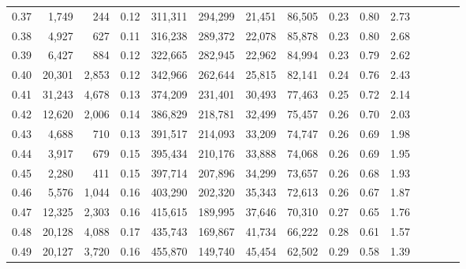 \begin{tabular}{rrrcrrrrrrrrrrr}
0.37 &   1,749 &    244 &                                       0.12 &  311,311 &  294,299 &   21,451 &   86,505 &  0.23 &  0.80 &                         2.73 \\
0.38 &   4,927 &    627 &                                       0.11 &  316,238 &  289,372 &   22,078 &   85,878 &  0.23 &  0.80 &                         2.68 \\
0.39 &   6,427 &    884 &                                       0.12 &  322,665 &  282,945 &   22,962 &   84,994 &  0.23 &  0.79 &                         2.62 \\
0.40 &  20,301 &  2,853 &                                       0.12 &  342,966 &  262,644 &   25,815 &   82,141 &  0.24 &  0.76 &                         2.43 \\
0.41 &  31,243 &  4,678 &                                       0.13 &  374,209 &  231,401 &   30,493 &   77,463 &  0.25 &  0.72 &                         2.14 \\
0.42 &  12,620 &  2,006 &                                       0.14 &  386,829 &  218,781 &   32,499 &   75,457 &  0.26 &  0.70 &                         2.03 \\
0.43 &   4,688 &    710 &                                       0.13 &  391,517 &  214,093 &   33,209 &   74,747 &  0.26 &  0.69 &                         1.98 \\
0.44 &   3,917 &    679 &                                       0.15 &  395,434 &  210,176 &   33,888 &   74,068 &  0.26 &  0.69 &                         1.95 \\
0.45 &   2,280 &    411 &                                       0.15 &  397,714 &  207,896 &   34,299 &   73,657 &  0.26 &  0.68 &                         1.93 \\
0.46 &   5,576 &  1,044 &                                       0.16 &  403,290 &  202,320 &   35,343 &   72,613 &  0.26 &  0.67 &                         1.87 \\
0.47 &  12,325 &  2,303 &                                       0.16 &  415,615 &  189,995 &   37,646 &   70,310 &  0.27 &  0.65 &                         1.76 \\
0.48 &  20,128 &  4,088 &                                       0.17 &  435,743 &  169,867 &   41,734 &   66,222 &  0.28 &  0.61 &                         1.57 \\
0.49 &  20,127 &  3,720 &                                       0.16 &  455,870 &  149,740 &   45,454 &   62,502 &  0.29 &  0.58 &                         1.39 \\

\end{tabular}

